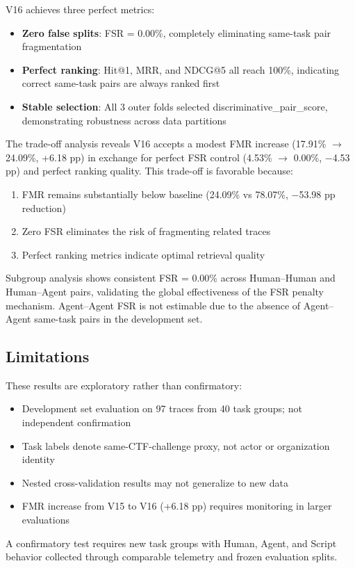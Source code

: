 V16 achieves three perfect metrics:
\begin{itemize}
    \item \textbf{Zero false splits}: FSR = 0.00\%, completely eliminating same-task pair fragmentation
    \item \textbf{Perfect ranking}: Hit@1, MRR, and NDCG@5 all reach 100\%, indicating correct same-task pairs are always ranked first
    \item \textbf{Stable selection}: All 3 outer folds selected discriminative\_pair\_score, demonstrating robustness across data partitions
\end{itemize}

The trade-off analysis reveals V16 accepts a modest FMR increase (17.91\% $\to$ 24.09\%, +6.18 pp) in exchange for perfect FSR control (4.53\% $\to$ 0.00\%, $-$4.53 pp) and perfect ranking quality. This trade-off is favorable because:
\begin{enumerate}
    \item FMR remains substantially below baseline (24.09\% vs 78.07\%, $-$53.98 pp reduction)
    \item Zero FSR eliminates the risk of fragmenting related traces
    \item Perfect ranking metrics indicate optimal retrieval quality
\end{enumerate}

Subgroup analysis shows consistent FSR = 0.00\% across Human--Human and Human--Agent pairs, validating the global effectiveness of the FSR penalty mechanism. Agent--Agent FSR is not estimable due to the absence of Agent--Agent same-task pairs in the development set.

\subsection{Limitations}

These results are exploratory rather than confirmatory:
\begin{itemize}
    \item Development set evaluation on 97 traces from 40 task groups; not independent confirmation
    \item Task labels denote same-CTF-challenge proxy, not actor or organization identity
    \item Nested cross-validation results may not generalize to new data
    \item FMR increase from V15 to V16 (+6.18 pp) requires monitoring in larger evaluations
\end{itemize}

A confirmatory test requires new task groups with Human, Agent, and Script behavior collected through comparable telemetry and frozen evaluation splits.
